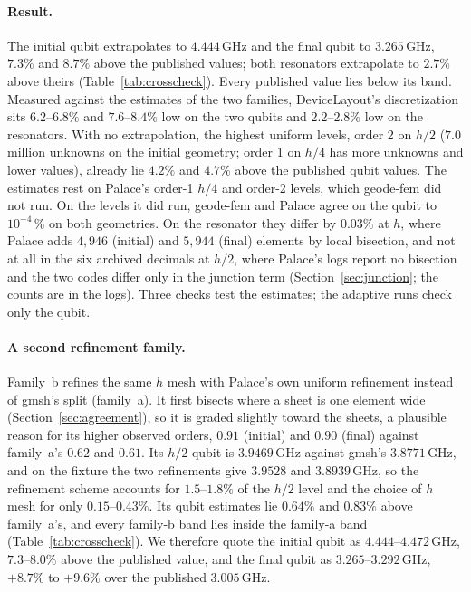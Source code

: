 \documentclass{anvil-paper}
\begin{document}
\paragraph{Result.}
The initial qubit extrapolates to $4.444$\,GHz and the final qubit to
$3.265$\,GHz, $7.3\%$ and $8.7\%$ above the published values; both
resonators extrapolate to $2.7\%$ above theirs
(Table~\ref{tab:crosscheck}). Every published value lies below its band.
Measured against the estimates of the two families, DeviceLayout's
discretization sits $6.2$--$6.8\%$ and $7.6$--$8.4\%$ low on the two qubits
and $2.2$--$2.8\%$ low on the resonators. With no extrapolation, the
highest uniform levels, order 2 on $h/2$ ($7.0$ million unknowns on the
initial geometry; order 1 on $h/4$ has more unknowns and lower values),
already lie $4.2\%$ and $4.7\%$ above the published qubit values. The
estimates rest on Palace's order-1 $h/4$ and order-2 levels, which
geode-fem did not run. On the levels it did run, geode-fem and Palace
agree on the qubit to $10^{-4}\,\%$ on both geometries. On the resonator
they differ by $0.03\%$ at $h$, where Palace adds $4{,}946$ (initial) and
$5{,}944$ (final) elements by local bisection, and not at all in the six
archived decimals at $h/2$, where Palace's logs report no bisection and
the two codes differ only in the junction term
(Section~\ref{sec:junction}; the counts are in the logs). Three checks
test the estimates; the adaptive runs check only the qubit.

\paragraph{A second refinement family.}
Family~b refines the same $h$ mesh with Palace's own uniform refinement
instead of gmsh's split (family~a). It first bisects where a sheet is one
element wide (Section~\ref{sec:agreement}), so it is graded slightly
toward the sheets, a plausible reason for its higher observed orders,
$0.91$ (initial) and $0.90$ (final) against family~a's $0.62$ and $0.61$.
Its $h/2$ qubit is $3.9469$\,GHz against gmsh's $3.8771$\,GHz, and on the
fixture the two refinements give $3.9528$ and $3.8939$\,GHz, so the
refinement scheme accounts for $1.5$--$1.8\%$ of the $h/2$ level and the
choice of $h$ mesh for only $0.15$--$0.43\%$. Its qubit estimates lie
$0.64\%$ and $0.83\%$ above family~a's, and every family-b band lies
inside the family-a band (Table~\ref{tab:crosscheck}). We therefore quote
the initial qubit as $4.444$--$4.472$\,GHz, $7.3$--$8.0\%$ above the
published value, and the final qubit as $3.265$--$3.292$\,GHz, $+8.7\%$ to
$+9.6\%$ over the published $3.005$\,GHz.
\end{document}

